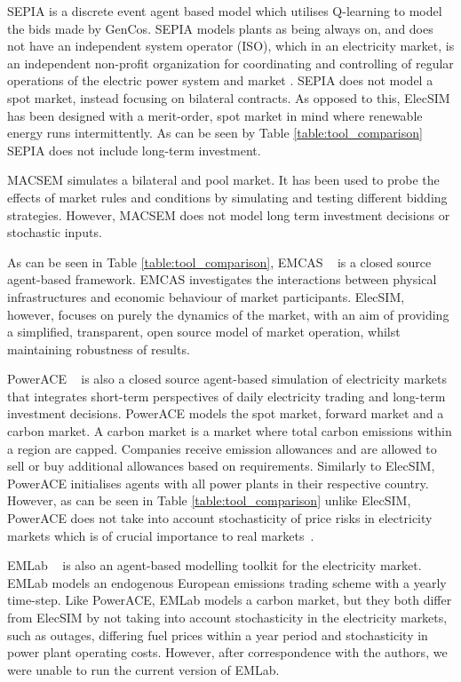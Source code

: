SEPIA \cite{Harp2000} is a discrete event agent based model which utilises Q-learning to model the bids made by GenCos. SEPIA models plants as being always on, and does not have an independent system operator (ISO), which in an electricity market, is an independent non-profit organization for coordinating and controlling of regular operations of the electric power system and market  \cite{Zhou2007}. SEPIA does not model a spot market, instead focusing on bilateral contracts. As opposed to this, ElecSIM has been designed with a merit-order, spot market in mind where renewable energy runs intermittently. As can be seen by Table \ref{table:tool_comparison} SEPIA does not include long-term investment. 

MACSEM \cite{Praca2003} simulates a bilateral and pool market. It has been used to probe the effects of market rules and conditions by simulating and testing different bidding strategies. However, MACSEM does not model long term investment decisions or stochastic inputs.

As can be seen in Table \ref{table:tool_comparison}, EMCAS ~\cite{Conzelmann} is a closed source agent-based framework. EMCAS investigates the interactions between physical infrastructures and economic behaviour of market participants. ElecSIM, however, focuses on purely the dynamics of the market, with an aim of providing a simplified, transparent, open source model of market operation, whilst maintaining robustness of results.

PowerACE ~\cite{Rothengatter2007} is also a closed source agent-based simulation of electricity markets that integrates short-term perspectives of daily electricity trading and long-term investment decisions. PowerACE models the spot market, forward market and a carbon market. A carbon market is a market where total carbon emissions within a region are capped. Companies receive emission allowances and are allowed to sell or buy additional allowances based on requirements. Similarly to ElecSIM, PowerACE initialises agents with all power plants in their respective country. However, as can be seen in Table \ref{table:tool_comparison} unlike ElecSIM, PowerACE does not take into account stochasticity of price risks in electricity markets which is of crucial importance to real markets~\cite{Most2010}.

EMLab ~\cite{Chappin2017} is also an agent-based modelling toolkit for the electricity market. EMLab models an endogenous European emissions trading scheme with a yearly time-step. Like PowerACE, EMLab models a carbon market, but they both differ from ElecSIM by not taking into account stochasticity in the electricity markets, such as outages, differing fuel prices within a year period and stochasticity in power plant operating costs. However, after correspondence with the authors, we were unable to run the current version of EMLab.


